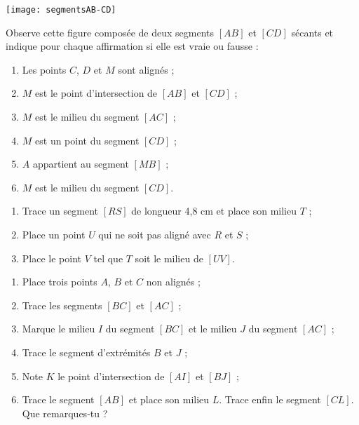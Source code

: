 \begin{exercice}
 \begin{center} \texttt{[image: segmentsAB-CD]}  \end{center}
 Observe cette figure composée de deux segments $[AB]$ et $[CD]$ sécants et indique pour chaque affirmation si elle est vraie ou fausse :
 \begin{enumerate}
  \item Les points $C$, $D$ et $M$ sont alignés ;
  \item $M$ est le point d'intersection de $[AB]$ et $[CD]$ ;
  \item $M$ est le milieu du segment $[AC]$ ;
  \item $M$ est un point du segment $[CD]$ ;
  \item $A$ appartient au segment $[MB]$ ;
  \item $M$ est le milieu du segment $[CD]$.
 \end{enumerate}
\end{exercice}


\begin{exercice}[Milieux]
\begin{enumerate} 
 \item Trace un segment $[RS]$ de longueur 4,8 cm et place son milieu $T$ ;
 \item Place un point $U$ qui ne soit pas aligné avec $R$ et $S$ ;
 \item Place le point $V$ tel que $T$ soit le milieu de $[UV]$.
 \end{enumerate}
\end{exercice}


\begin{exercice}[À construire]
\begin{enumerate} 
 \item Place trois points $A$, $B$ et $C$ non alignés ;
 \item Trace les segments $[BC]$ et $[AC]$ ;
 \item Marque le milieu $I$ du segment $[BC]$ et le milieu $J$ du segment $[AC]$ ;
 \item Trace le segment d'extrémités $B$ et $J$ ;
 \item Note $K$ le point d'intersection de $[AI]$ et $[BJ]$ ;
 \item Trace le segment $[AB]$ et place son milieu $L$. Trace enfin le segment $[CL]$. Que remarques‑tu ?
 \end{enumerate}
\end{exercice}


